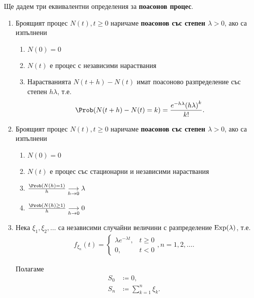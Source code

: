 \documentclass[numbers=endperiod, bibliography=totocnumbered]{scrartcl}
\begin{document}
\begin{definition}
  Ще дадем три еквивалентни определения за \textbf{поасонов процес}.

  \begin{enumerate}
    \item\label{def:poisson_process/increments} Броящият процес \( N(t), t \geq 0 \) наричаме \textbf{поасонов със степен \( \lambda > 0 \)}, ако са изпълнени
    \begin{enumerate}
      \item \( N(0) = 0 \)
      \item \( N(t) \) е процес с независими нараствания
      \item Нарастванията \( N(t+h)-N(t) \) имат поасоново разпределение със степен \( h\lambda \), т.е.
      \begin{equation*}
        \Prob(N(t+h)-N(t) = k)
        =
        \frac{e^{-h\lambda} {(h\lambda)}^k} {k!}.
      \end{equation*}
    \end{enumerate}

    \item\label{def:poisson_process/limits} Броящият процес \( N(t), t \geq 0 \) наричаме \textbf{поасонов със степен \( \lambda > 0 \)}, ако са изпълнени
    \begin{enumerate}
      \item \( N(0) = 0 \)
      \item \( N(t) \) е процес със стационарни и независими нараствания
      \item \( \frac {\Prob(N(h) = 1)} h \Conv[h \to 0]{} \lambda \)
      \item \( \frac {\Prob(N(h) \geq 1)} h \Conv[h \to 0]{} 0 \)
    \end{enumerate}

    \item\label{def:poisson_process/waiting_times} Нека \( \xi_1, \xi_2, \ldots \) са независими случайни величини с разпределение \( \operatorname{Exp}(\lambda) \), т.е.
    \begin{align*}
      f_{\xi_n}(t) =
      \begin{cases}
        \lambda e^{-\lambda t}, &t \geq 0 \\
        0, &t < 0
      \end{cases},
      n = 1, 2, \ldots.
    \end{align*}

    Полагаме
    \begin{align*}
      S_0 &\coloneqq 0, \\
      S_n &\coloneqq \sum_{k=1}^n \xi_k.
    \end{align*}


\end{enumerate}
\end{definition}
\end{document}
